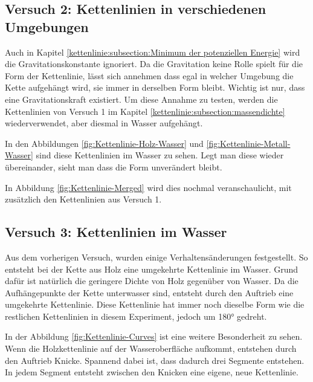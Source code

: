 \subsection{Versuch 2: Kettenlinien in verschiedenen Umgebungen
\label{kettenlinie:subsection:umgebung}}
Auch in Kapitel \ref{kettenlinie:subsection:Minimum der potenziellen Energie} wird die Gravitationskonstante ignoriert.
Da die Gravitation keine Rolle spielt für die Form der Kettenlinie, lässt sich annehmen dass egal in welcher Umgebung die Kette aufgehängt wird, sie immer in derselben Form bleibt.
Wichtig ist nur, dass eine Gravitationskraft existiert.
Um diese Annahme zu testen, werden die Kettenlinien von Versuch 1 im Kapitel \ref{kettenlinie:subsection:massendichte} wiederverwendet, aber diesmal in Wasser aufgehängt.

In den Abbildungen \ref{fig:Kettenlinie-Holz-Wasser} und \ref{fig:Kettenlinie-Metall-Wasser} sind diese Kettenlinien im Wasser zu sehen.
Legt man diese wieder übereinander, sieht man dass die Form unverändert bleibt.

In Abbildung \ref{fig:Kettenlinie-Merged} wird dies nochmal veranschaulicht, mit zusätzlich den Kettenlinien aus Versuch 1.

\subsection{Versuch 3: Kettenlinien im Wasser
\label{kettenlinie:subsection:wasser}}

Aus dem vorherigen Versuch, wurden einige Verhaltensänderungen festgestellt.
So entsteht bei der Kette aus Holz eine umgekehrte Kettenlinie im Wasser.
Grund dafür ist natürlich die geringere Dichte von Holz gegenüber von Wasser.
Da die Aufhängepunkte der Kette unterwasser sind, entsteht durch den Auftrieb eine umgekehrte Kettenlinie.
Diese Kettenlinie hat immer noch dieselbe Form wie die restlichen Kettenlinien in diesem Experiment, jedoch um 180° gedreht.

In der Abbildung \ref{fig:Kettenlinie-Curves} ist eine weitere Besonderheit zu sehen.
Wenn die Holzkettenlinie auf der Wasseroberfläche aufkommt, entstehen durch den Auftrieb Knicke.
Spannend dabei ist, dass dadurch drei Segmente entstehen.
In jedem Segment entsteht zwischen den Knicken eine eigene, neue Kettenlinie.

